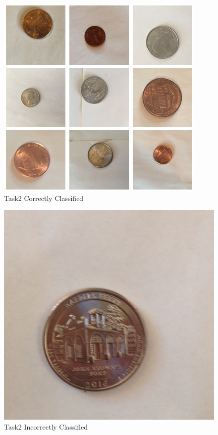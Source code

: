 \documentclass[10pt,journal,compsoc]{IEEEtran}
\begin{document}
\begin{figure}[h]
      \centering
      \includegraphics[width=\linewidth]{Assets/testset2_10/report/correctcoins.JPG}
      \caption{Task2 Correctly Classified }
      \label{fig:Task2 Correctly Classified}
\end{figure}


\begin{figure}[h]
      \centering
      \includegraphics[width=\linewidth]{Assets/testset2_10/report/IMG_2684.JPG}
      \caption{Task2 Incorrectly Classified }
      \label{fig:Task2 Incorrectly Classified}
\end{figure}
\end{document}
